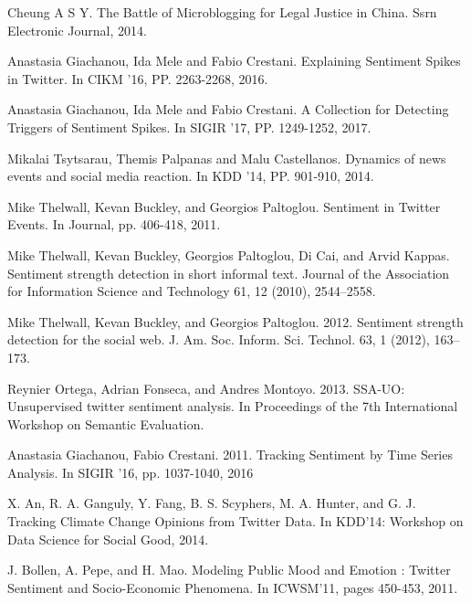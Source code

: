 \documentclass[runningheads]{llncs}
\begin{document}
\begin{thebibliography}{8}

Cheung A S Y. 
\newblock The Battle of Microblogging for Legal Justice in China. 
\newblock Ssrn Electronic Journal, 2014.

Anastasia Giachanou, Ida Mele and Fabio Crestani.
\newblock  Explaining Sentiment Spikes in Twitter.
\newblock In CIKM ’16, PP. 2263-2268, 2016.

Anastasia Giachanou, Ida Mele and Fabio Crestani.
\newblock  A Collection for Detecting Triggers of Sentiment Spikes.
\newblock In SIGIR ’17, PP. 1249-1252, 2017.

Mikalai Tsytsarau, Themis Palpanas and Malu Castellanos.
\newblock  Dynamics of news events and social media reaction.
\newblock In KDD ’14, PP. 901-910, 2014.

Mike Thelwall, Kevan Buckley, and Georgios Paltoglou.
\newblock Sentiment in Twitter Events.
\newblock In Journal, pp. 406-418, 2011.

Mike Thelwall, Kevan Buckley, Georgios Paltoglou, Di Cai, and Arvid Kappas.
\newblock Sentiment strength detection in short informal text.
\newblock Journal of the Association for Information Science and Technology 61, 12 (2010), 2544–2558.

Mike Thelwall, Kevan Buckley, and Georgios Paltoglou. 2012.
\newblock Sentiment strength detection for the social web.
\newblock J. Am. Soc. Inform. Sci. Technol. 63, 1 (2012), 163–173.

Reynier Ortega, Adrian Fonseca, and Andres Montoyo. 2013.
\newblock SSA-UO: Unsupervised twitter sentiment analysis.
\newblock In Proceedings of the 7th International Workshop on Semantic Evaluation.

Anastasia Giachanou, Fabio Crestani. 2011.
\newblock Tracking Sentiment by Time Series Analysis.
\newblock In SIGIR ’16, pp. 1037-1040, 2016

X. An, R. A. Ganguly, Y. Fang, B. S. Scyphers, M. A. Hunter, and G. J.
\newblock Tracking Climate Change Opinions from Twitter Data. 
\newblock In KDD’14: Workshop on Data Science for Social Good, 2014.

J. Bollen, A. Pepe, and H. Mao.
\newblock Modeling Public Mood and Emotion : Twitter Sentiment and Socio-Economic Phenomena. 
\newblock In ICWSM’11, pages 450-453, 2011.


\end{thebibliography}
\end{document}
